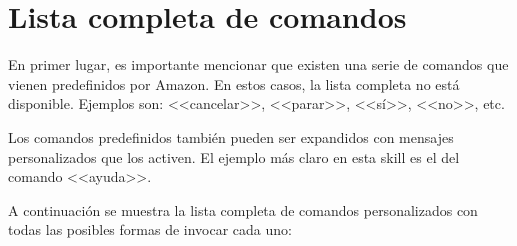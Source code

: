 \documentclass[11pt,spanish,listoffigures,listoftables,table,hyphens,dvipsnames]{tfgetsinf}
\begin{document}
\section{Lista completa de comandos}

En primer lugar, es importante mencionar que existen una serie de comandos que vienen predefinidos por Amazon. En estos casos, la lista completa no está disponible. Ejemplos son: <<cancelar>>, <<parar>>, <<sí>>, <<no>>, etc.

Los comandos predefinidos también pueden ser expandidos con mensajes personalizados que los activen. El ejemplo más claro en esta skill es el del comando <<ayuda>>.

A continuación se muestra la lista completa de comandos personalizados con todas las posibles formas de invocar cada uno:
\end{document}
